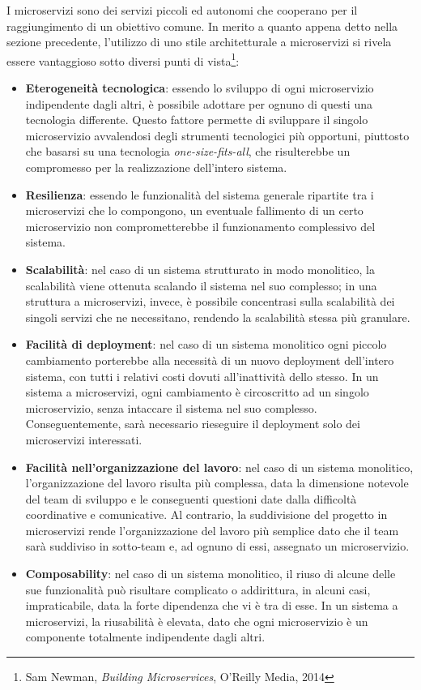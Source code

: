 \documentclass[a4paper,12pt]{report}
\begin{document}
I microservizi sono dei servizi piccoli ed autonomi che cooperano per il raggiungimento di un obiettivo comune. In merito a quanto appena detto nella sezione precedente, l'utilizzo di uno stile architetturale a microservizi si rivela essere vantaggioso sotto diversi punti di vista\footnote{Sam Newman, {\em Building Microservices}, O'Reilly Media, 2014}:
\begin{itemize}
	\item \textbf{Eterogeneità tecnologica}: essendo lo sviluppo di ogni microservizio indipendente dagli altri, è possibile adottare per ognuno di questi una tecnologia differente. Questo fattore permette di sviluppare il singolo microservizio avvalendosi degli strumenti tecnologici più opportuni, piuttosto che basarsi su una tecnologia \emph{one-size-fits-all}, che risulterebbe un compromesso per la realizzazione dell'intero sistema.
	\item \textbf{Resilienza}: essendo le funzionalità del sistema generale ripartite tra i microservizi che lo compongono, un eventuale fallimento di un certo microservizio non comprometterebbe il funzionamento complessivo del sistema.
	\item \textbf{Scalabilità}: nel caso di un sistema strutturato in modo monolitico, la scalabilità viene ottenuta scalando il sistema nel suo complesso; in una struttura a microservizi, invece, è possibile concentrasi sulla scalabilità dei singoli servizi che ne necessitano, rendendo la scalabilità stessa più granulare.
	\item \textbf{Facilità di deployment}: nel caso di un sistema monolitico ogni piccolo cambiamento porterebbe alla necessità di un nuovo deployment dell'intero sistema, con tutti i relativi costi dovuti all'inattività dello stesso. In un sistema a microservizi, ogni cambiamento è circoscritto ad un singolo microservizio, senza intaccare il sistema nel suo complesso. Conseguentemente, sarà necessario rieseguire il deployment solo dei microservizi interessati.
	\item \textbf{Facilità nell'organizzazione del lavoro}: nel caso di un sistema monolitico, l'organizzazione del lavoro risulta più complessa, data la dimensione notevole del team di sviluppo e le conseguenti questioni date dalla difficoltà coordinative e comunicative. Al contrario, la suddivisione del progetto in microservizi rende l'organizzazione del lavoro più semplice dato che il team sarà suddiviso in sotto-team e, ad ognuno di essi, assegnato un microservizio.
	\item \textbf{Composability}: nel caso di un sistema monolitico, il riuso di alcune delle sue funzionalità può risultare complicato o addirittura, in alcuni casi, impraticabile, data la forte dipendenza che vi è tra di esse. In un sistema a microservizi, la riusabilità è elevata, dato che ogni microservizio è un componente totalmente indipendente dagli altri.

\end{itemize}
\end{document}
